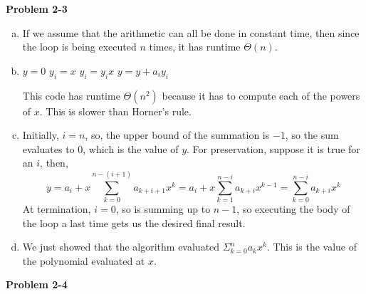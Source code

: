 \documentclass{article}
\begin{document}
\noindent\textbf{Problem 2-3}\\

\begin{enumerate}[a.]
\item

If we assume that the arithmetic can all  be done in constant time, then since  the loop is being executed $n$ times, it has runtime $\Theta(n)$.

\item
\begin{algorithm}
\begin{algorithmic}[1]
\State $y=0$
\State $y_i = x$
\State $y_i = y_i  x$ 
\EndFor
\State $y = y+ a_i  y_i$
\EndFor
\end{algorithmic}
\end{algorithm}
This code has runtime $\Theta(n^2)$ because it has to compute each of the powers of $x$. This is slower than Horner's rule.

\item
Initially, $i=n$, so, the upper bound of the summation is $-1$, so the sum evaluates to $0$, which is the value of $y$. For preservation, suppose it is true for an $i$, then, 
\[
 y = a_{i} + x \sum_{k=0}^{n-(i+1)} a_{k+i+1} x^k = a_i + x\sum_{k=1}^{n-i} a_{k+i} x^{k-1} = \sum_{k=0}^{n-i} a_{k+i}x^k
 \]
  At termination, $i=0$, so is summing up to $n-1$, so executing the body of the loop a last time gets us  the desired final result.

\item
We just showed that the algorithm evaluated $\Sigma_{k=0}^n a_kx^k$. This is the value of the polynomial evaluated at $x$.

\end{enumerate}


\noindent\textbf{Problem 2-4}
\end{document}

